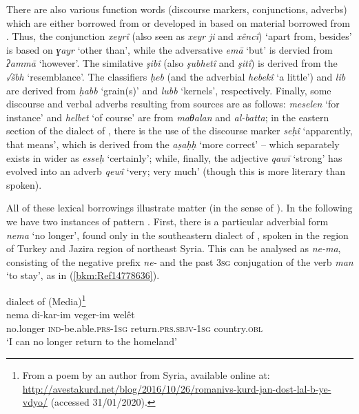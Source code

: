 \documentclass[output=paper]{langsci/langscibook}
\begin{document}
There are also various function words (discourse markers, conjunctions, adverbs) which are either borrowed from  or developed in  based on material borrowed from . Thus, the conjunction \textit{xeyrî} (also seen as \textit{xeyr} \textit{ji} and \textit{xêncî}) ‘apart from, besides’ is based on  \textit{ɣayr} ‘other than’, while the adversative \textit{emā} ‘but’ is dervied from  \textit{ʔammā} ‘however’. The similative \textit{şibî} (also \textit{şubhetî} and \textit{şitî}) is derived from the   \textit{√šbh} ‘resemblance’. The classifiers \textit{ḥeb} (and the adverbial \textit{hebekî} ‘a little’) and \textit{lib} are derived from  \textit{ḥabb} ‘grain(s)’ and \textit{lubb} ‘kernels’, respectively. Finally, some discourse and verbal adverbs resulting from  sources are as follows: \textit{meselen} ‘for instance’ and \textit{helbet} ‘of course’ are from  \textit{maθalan} and \textit{al-batta}; in the eastern section of the  dialect of , there is the use of the discourse marker \textit{seḥî} ‘apparently, that means’, which is derived from the  \textit{aṣaḥḥ} ‘more correct’ – which separately exists in wider  as \textit{esseḥ} ‘certainly’; while, finally, the  adjective \textit{qawī} ‘strong’ has evolved into an adverb \textit{qewî} ‘very; very much’ (though this is more literary than spoken).      

All of these lexical borrowings illustrate matter  (in the sense of \citealt{MatrasSakel2007}). In the following we have two instances of pattern . First, there is a particular adverbial form \textit{nema} ‘no longer’, found only in the southeastern dialect of , spoken in the  region of Turkey and Jazira region of northeast Syria. This can be analysed as \textit{ne-ma}, consisting of the negative prefix \textit{ne-} and the past  3\textsc{sg} conjugation of the verb \textit{man} ‘to stay’, as in (\ref{bkm:Ref14778636}).

\ea
{} dialect of   (Media)\label{bkm:Ref14778636}\footnote{From a poem by an author from Syria, available online at: \url{http://avestakurd.net/blog/2016/10/26/romanivs-kurd-jan-dost-lal-b-ye-vdyo/} (accessed 31/01/2020).} \\
\gll nema di-kar-im veger-im welêt\\
     no.longer \textsc{ind}{}-be.able.\textsc{prs-1sg} return.\textsc{prs.sbjv-1sg} country.\textsc{obl}\\
\glt `I can no longer return to the homeland'\z
\end{document}
